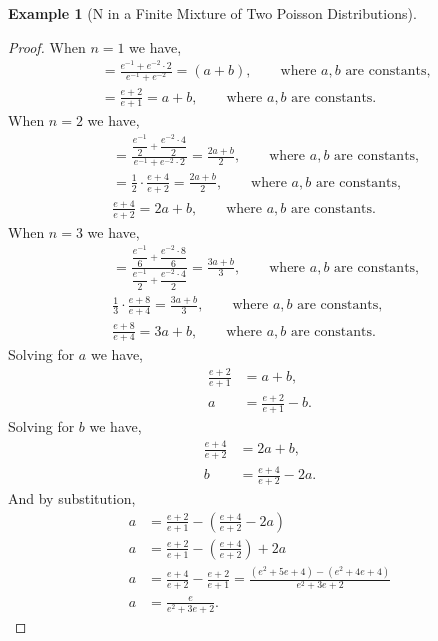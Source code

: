 \documentclass[11pt]{amsart}
\theoremstyle{definition}
\newtheorem{example}{Example}
\theoremstyle{plain}
\begin{document}
\begin{example}[N in a Finite Mixture of Two Poisson Distributions]
\begin{proof}
When $n = 1$ we have,
\begin{align*}
    &= \frac{e^{-1} + e^{-2} \cdot 2}{e^{-1} + e^{-2}}
     = (a + b),
     \qquad \text{where } a, b \text{ are constants,}\\
    &= \frac{e + 2}{e + 1} = a + b,
     \qquad \text{where } a, b \text{ are constants.}
\end{align*}
When $n = 2$ we have,
\begin{align*}
    &= \frac{\dfrac{e^{-1}}{2} + \dfrac{e^{-2} \cdot 4}{2}}{e^{-1} + e^{-2} \cdot 2}
     = \frac{2a + b}{2},
     \qquad \text{where } a, b \text{ are constants,}\\
    &= \frac{1}{2} \cdot \frac{e + 4}{e + 2}
     = \frac{2a + b}{2},
     \qquad \text{where } a, b \text{ are constants,}\\
    &\frac{e + 4}{e + 2} = 2a + b,
     \qquad \text{where } a, b \text{ are constants.}
\end{align*}
When $n = 3$ we have,
\begin{align*}
    &= \frac{\dfrac{e^{-1}}{6} + \dfrac{e^{-2} \cdot 8}{6}}{\dfrac{e^{-1}}{2} + \dfrac{e^{-2} \cdot 4}{2}}
     = \frac{3a + b}{3},
     \qquad \text{where } a, b \text{ are constants,}\\
    &\frac{1}{3} \cdot \frac{e + 8}{e + 4} = \frac{3a + b}{3},
     \qquad \text{where } a, b \text{ are constants,}\\
    &\frac{e + 8}{e + 4} = 3a + b,
     \qquad \text{where } a, b \text{ are constants.}
\end{align*}
Solving for $a$ we have,
\begin{align*}
    \frac{e + 2}{e + 1} &= a + b,\\
    a &= \frac{e + 2}{e + 1} - b.
\end{align*}
Solving for $b$ we have,
\begin{align*}
    \frac{e + 4}{e + 2} &= 2a + b,\\
    b &= \frac{e + 4}{e + 2} - 2a.
\end{align*}
And by substitution,
\begin{align*}
    a &= \frac{e + 2}{e + 1} - \left(\frac{e + 4}{e + 2} - 2a\right)\\
    a &= \frac{e + 2}{e + 1} - \left(\frac{e + 4}{e + 2}\right) + 2a\\
    a &= \frac{e + 4}{e + 2} - \frac{e + 2}{e + 1}
       = \frac{(e^2 + 5e + 4) - (e^2 + 4e + 4)}{e^2 + 3e + 2}\\
    a &= \frac{e}{e^2 + 3e + 2}.
\end{align*}

\end{proof}
\end{example}
\end{document}
